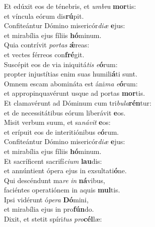 \evenverse Et edúxit eos de ténebris, et \textit{um}\textit{bra} \textbf{mor}tis:~\*\\
\evenverse et víncula eórum dis\textbf{rú}pit.\\
\oddverse Confiteántur Dómino misericór\textit{di}\textit{æ} \textbf{e}jus:~\*\\
\oddverse et mirabília ejus fíliis \textbf{hó}minum.\\
\evenverse Quia contrívit \textit{por}\textit{tas} \textbf{ǽ}reas:~\*\\
\evenverse et vectes férreos con\textbf{fré}git.\\
\oddverse Suscépit eos de via iniquitá\textit{tis} \textit{e}\textbf{ó}rum:~\*\\
\oddverse propter injustítias enim suas humili\textbf{á}ti sunt.\\
\evenverse Omnem escam abomináta est áni\textit{ma} \textit{e}\textbf{ó}rum:~\*\\
\evenverse et appropinquavérunt usque ad portas \textbf{mor}tis.\\
\oddverse Et clamavérunt ad Dóminum cum tri\textit{bu}\textit{la}\textbf{rén}tur:~\*\\
\oddverse et de necessitátibus eórum liberávit \textbf{e}os.\\
\evenverse Misit verbum suum, et sa\textit{ná}\textit{vit} \textbf{e}os:~\*\\
\evenverse et erípuit eos de interitiónibus e\textbf{ó}rum.\\
\oddverse Confiteántur Dómino misericór\textit{di}\textit{æ} \textbf{e}jus:~\*\\
\oddverse et mirabília ejus fíliis \textbf{hó}minum.\\
\evenverse Et sacríficent sacrifí\textit{ci}\textit{um} \textbf{lau}dis:~\*\\
\evenverse et annúntient ópera ejus in exsultati\textbf{ó}ne.\\
\oddverse Qui descéndunt ma\textit{re} \textit{in} \textbf{ná}vibus,~\*\\
\oddverse faciéntes operatiónem in aquis \textbf{mul}tis.\\
\evenverse Ipsi vidérunt ó\textit{pe}\textit{ra} \textbf{Dó}mini,~\*\\
\evenverse et mirabília ejus in pro\textbf{fún}do.\\
\oddverse Dixit, et stetit spíri\textit{tus} \textit{pro}\textbf{cél}læ:~\*\\
